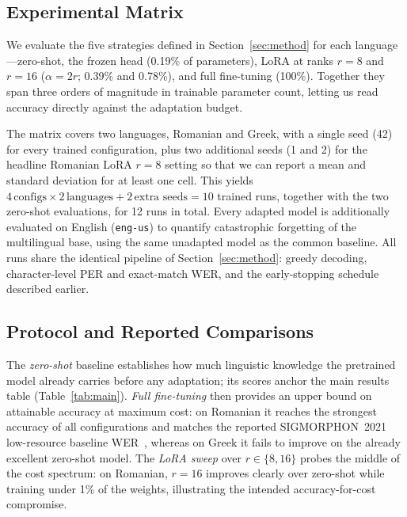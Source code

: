 \documentclass[conference]{IEEEtran}
\begin{document}
\subsection{Experimental Matrix}

We evaluate the five strategies defined in Section~\ref{sec:method} for each language---zero-shot, the frozen head (0.19\% of parameters), LoRA at ranks $r{=}8$ and $r{=}16$ ($\alpha{=}2r$; 0.39\% and 0.78\%), and full fine-tuning (100\%). Together they span three orders of magnitude in trainable parameter count, letting us read accuracy directly against the adaptation budget.

The matrix covers two languages, Romanian and Greek, with a single seed (42) for every trained configuration, plus two additional seeds (1 and 2) for the headline Romanian LoRA $r{=}8$ setting so that we can report a mean and standard deviation for at least one cell. This yields $4\,\text{configs}\times 2\,\text{languages} + 2\,\text{extra seeds} = 10$ trained runs, together with the two zero-shot evaluations, for 12 runs in total. Every adapted model is additionally evaluated on English (\texttt{eng-us}) to quantify catastrophic forgetting of the multilingual base, using the same unadapted model as the common baseline. All runs share the identical pipeline of Section~\ref{sec:method}: greedy decoding, character-level PER and exact-match WER, and the early-stopping schedule described earlier.

\subsection{Protocol and Reported Comparisons}

The \emph{zero-shot} baseline establishes how much linguistic knowledge the pretrained model already carries before any adaptation; its scores anchor the main results table (Table~\ref{tab:main}). \emph{Full fine-tuning} then provides an upper bound on attainable accuracy at maximum cost: on Romanian it reaches the strongest accuracy of all configurations and matches the reported SIGMORPHON~2021 low-resource baseline WER~\cite{ashby2021}, whereas on Greek it fails to improve on the already excellent zero-shot model. The \emph{LoRA sweep} over $r\in\{8,16\}$ probes the middle of the cost spectrum: on Romanian, $r{=}16$ improves clearly over zero-shot while training under 1\% of the weights, illustrating the intended accuracy-for-cost compromise.
\end{document}

